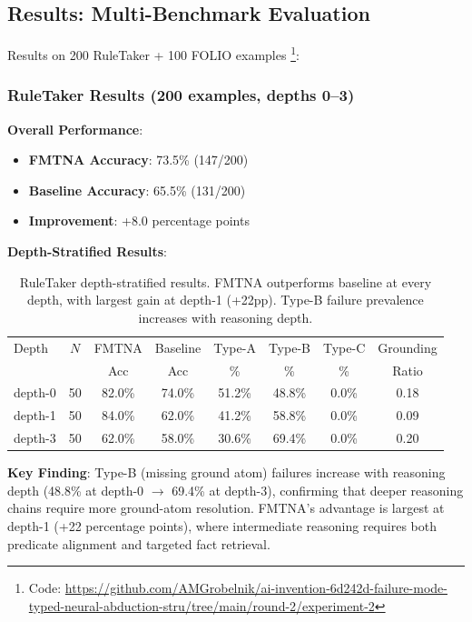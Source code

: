 \documentclass[11pt,letterpaper]{article}
\begin{document}
\subsection{Results: Multi-Benchmark Evaluation}

Results on 200 RuleTaker + 100 FOLIO examples%
\footnote{Code: \url{https://github.com/AMGrobelnik/ai-invention-6d242d-failure-mode-typed-neural-abduction-stru/tree/main/round-2/experiment-2}}:

\subsubsection{RuleTaker Results (200 examples, depths 0--3)}

\textbf{Overall Performance}:
\begin{itemize}
  \item \textbf{FMTNA Accuracy}: 73.5\% (147/200)
  \item \textbf{Baseline Accuracy}: 65.5\% (131/200)
  \item \textbf{Improvement}: +8.0 percentage points
\end{itemize}

\textbf{Depth-Stratified Results}:

\begin{table}[!htbp]
  \centering
  \caption{RuleTaker depth-stratified results. FMTNA outperforms baseline at every depth, with largest gain at depth-1 (+22pp). Type-B failure prevalence increases with reasoning depth.}
  \label{tab:ruletaker}
  \small
  \begin{tabular}{lccccccc}
    \toprule
    Depth & $N$ & FMTNA & Baseline & Type-A & Type-B & Type-C & Grounding \\
          &     & Acc   & Acc      & \%     & \%     & \%     & Ratio \\
    \midrule
    depth-0 & 50 & 82.0\% & 74.0\% & 51.2\% & 48.8\% & 0.0\% & 0.18 \\
    depth-1 & 50 & 84.0\% & 62.0\% & 41.2\% & 58.8\% & 0.0\% & 0.09 \\
    depth-3 & 50 & 62.0\% & 58.0\% & 30.6\% & 69.4\% & 0.0\% & 0.20 \\
    \bottomrule
  \end{tabular}
\end{table}

\textbf{Key Finding}: Type-B (missing ground atom) failures increase with reasoning depth (48.8\% at depth-0 $\to$ 69.4\% at depth-3), confirming that deeper reasoning chains require more ground-atom resolution. FMTNA's advantage is largest at depth-1 (+22 percentage points), where intermediate reasoning requires both predicate alignment and targeted fact retrieval.
\end{document}
